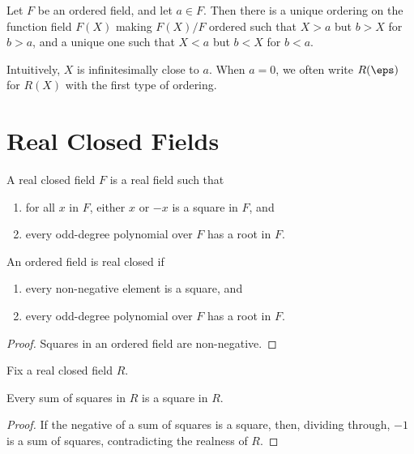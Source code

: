 \begin{lemma}
  \label{lem:order_fun_field}
  Let $F$ be an ordered field, and let $a\in F$. Then there is a unique ordering on the function field $F(X)$ making $F(X)/F$ ordered such that $X>a$ but $b>X$ for $b>a$, and a unique one such that $X<a$ but $b<X$ for $b<a$.
\end{lemma}

Intuitively, $X$ is infinitesimally close to $a$. When $a=0$, we often write $R(\eps)$ for $R(X)$ with the first type of ordering.

\section{Real Closed Fields}

\begin{definition}
  \label{def:RCF}
  \leanok
  A real closed field $F$ is a real field such that
  \begin{enumerate}
    \item for all $x$ in $F$, either $x$ or $-x$ is a square in $F$, and
    \item every odd-degree polynomial over $F$ has a root in $F$.
  \end{enumerate}
\end{definition}

\begin{lemma}
  \label{lem:RCF_ord_ax}
  \leanok
  An ordered field is real closed if
  \begin{enumerate}
    \item every non-negative element is a square, and
    \item every odd-degree polynomial over $F$ has a root in $F$.
  \end{enumerate}
\end{lemma}
\begin{proof}
  \leanok
  Squares in an ordered field are non-negative.
\end{proof}

Fix a real closed field $R$.

\begin{lemma}
  \label{lem:RCF_sumsq_is_sq}
  \leanok
  Every sum of squares in $R$ is a square in $R$.
\end{lemma}
\begin{proof}
  \leanok
  If the negative of a sum of squares is a square, then, dividing through, $-1$ is a sum of squares, contradicting the realness of $R$.
\end{proof}

